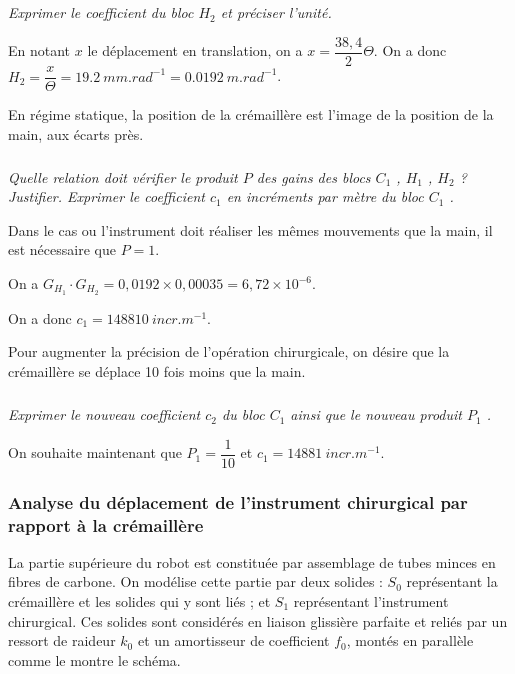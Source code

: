 \begin{multicols}{2}
\subparagraph{}\textit{Exprimer le coefficient du bloc $H_2$ et préciser l’unité.}
\ifprof
\begin{corrige}
En notant $x$ le déplacement en translation, on a $x=\dfrac{38,4}{2} \Theta$. On a donc $H_2 =\dfrac{x}{\Theta}=\SI{19,2}{mm.rad^{-1}}=\SI{0,0192}{m.rad^{-1}}$.   
\end{corrige}
\else
\fi

En régime statique, la position de la crémaillère est l’image de la position de la main, aux écarts près. 

\subparagraph{}\textit{Quelle relation doit vérifier le produit $P$ des gains des blocs $C_1$ , $H_1$ , $H_2$  ? Justifier.
Exprimer le coefficient $c_1$ en incréments par mètre du bloc $C_1$ .
}
\ifprof
\begin{corrige}
Dans le cas ou l'instrument doit réaliser les mêmes mouvements que la main, il est nécessaire que $P=1$. 

On  a $G_{H_1}\cdot G_{H_2} = 0,0192 \times 0,00035 = 6,72\times 10^{-6}$.
 
On a donc $c_1 = \SI{148 810}{incr.m^{-1}}$.
\end{corrige}
\else
\fi

Pour augmenter la précision de l’opération chirurgicale, on désire que la crémaillère se déplace 10 fois moins que la main. 




\subparagraph{}\textit{Exprimer le nouveau coefficient $c_2$ du bloc $C_1$ ainsi que le nouveau produit  $P_1$ . }
\ifprof
\begin{corrige}
On souhaite maintenant que $P_1=\dfrac{1}{10}$ et $c_1 = \SI{148 81}{incr.m^{-1}}$.
\end{corrige}
\else
\fi

\subsubsection*{Analyse du déplacement de l’instrument chirurgical par rapport à la crémaillère}

La partie supérieure du robot est constituée par assemblage de tubes minces en fibres de carbone. 
On modélise cette partie par deux solides : $S_0$ représentant la crémaillère et les solides qui y sont liés ;  et $S_1$ représentant l’instrument chirurgical. 
Ces solides sont considérés en liaison glissière parfaite et reliés par un ressort de raideur $k_0$ et un amortisseur de coefficient $f_0$, montés en parallèle comme le montre le schéma.


\end{multicols}
